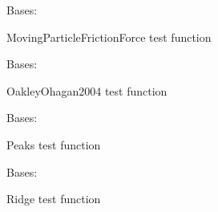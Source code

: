\documentclass[letterpaper,10pt,english,openany,oneside]{sphinxmanual}
\begin{document}

\begin{fulllineitems}
\label{\detokenize{pygpc:pygpc.Test.MovingParticleFrictionForce}}
Bases: {\hyperref[\detokenize{pygpc:pygpc.Test.Test}]{}}

MovingParticleFrictionForce test function

\end{fulllineitems}


\begin{fulllineitems}
\label{\detokenize{pygpc:pygpc.Test.OakleyOhagan2004}}
Bases: {\hyperref[\detokenize{pygpc:pygpc.Test.Test}]{}}

OakleyOhagan2004 test function

\end{fulllineitems}


\begin{fulllineitems}
\label{\detokenize{pygpc:pygpc.Test.Peaks}}
Bases: {\hyperref[\detokenize{pygpc:pygpc.Test.Test}]{}}

Peaks test function

\end{fulllineitems}


\begin{fulllineitems}
\label{\detokenize{pygpc:pygpc.Test.Ridge}}
Bases: {\hyperref[\detokenize{pygpc:pygpc.Test.Test}]{}}

Ridge test function

\end{fulllineitems}
\end{document}
